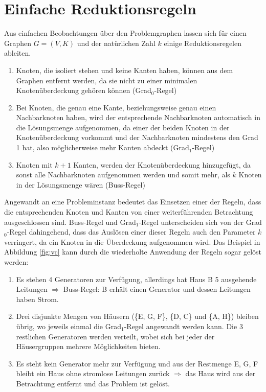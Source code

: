 \section{Einfache Reduktionsregeln}
\label{ch:Grundlagen:sec:Einfache Reduktionsregeln}
Aus einfachen Beobachtungen über den Problemgraphen lassen sich für einen Graphen $G=(V,K)$ und der natürlichen Zahl $k$ einige Reduktionsregelen ableiten.
\begin{enumerate}
\item Knoten, die isoliert stehen und keine Kanten haben, können aus dem Graphen entfernt werden, da sie nicht zu einer minimalen Knotenüberdeckung gehören können (Grad$_{0}$-Regel)
\item Bei Knoten, die genau eine Kante, beziehungsweise genau einen Nachbarknoten haben, wird der  entsprechende Nachbarknoten automatisch in die Lösungsmenge aufgenommen, da einer der beiden Knoten in der Knotenüberdeckung vorkommt und der Nachbarknoten mindestens den Grad 1 hat, also möglicherweise mehr Kanten abdeckt (Grad$_{1}$-Regel)
\item Knoten mit $k+1$ Kanten, werden der Knotenüberdeckung hinzugefügt, da sonst alle Nachbarknoten aufgenommen werden und somit mehr, als $k$ Knoten in der Lösungsmenge wären (Buss-Regel)
\end{enumerate}
Angewandt an eine Probleminstanz bedeutet das Einsetzen einer der Regeln, dass die entsprechenden Knoten und Kanten von einer weiterführenden Betrachtung ausgeschlossen sind. Buss-Regel und Grad$_{1}$-Regel unterscheiden sich von der Grad$_{0}$-Regel dahingehend, dass das Auslösen einer dieser Regeln auch den Parameter $k$ verringert, da ein Knoten in die Überdeckung aufgenommen wird.
 Das Beispiel in Abbildung \ref{fig:vc} kann durch die wiederholte Anwendung der Regeln sogar gelöst werden:
\begin{enumerate}
\item Es stehen 4 Generatoren zur Verfügung, allerdings hat Haus B 5 ausgehende Leitungen $\Rightarrow$ Buss-Regel: B erhält einen Generator und dessen Leitungen haben Strom.
\item Drei disjunkte Mengen von Häusern (\{E, G, F\}, \{D, C\} und \{A, H\}) bleiben übrig, wo jeweils einmal die Grad$_{1}$-Regel angewandt werden kann. Die 3 restlichen Generatoren werden verteilt, wobei sich bei jeder der Häusergruppen mehrere Möglichkeiten bieten.
\item Es steht kein Generator mehr zur Verfügung und aus der Restmenge {E, G, F} bleibt ein Haus ohne stromlose Leitungen zurück $\Rightarrow$ das Haus wird aus der Betrachtung entfernt und das Problem ist gelöst.
\end{enumerate}
